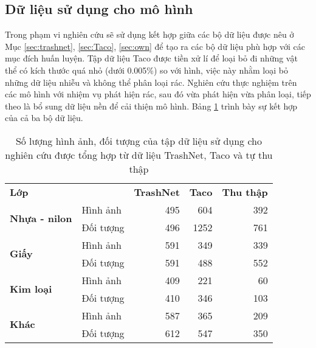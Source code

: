 \documentclass[../the.tex]{subfiles}
\begin{document}
\subsection{Dữ liệu sử dụng cho mô hình}
{\fontsize{13}{12} \selectfont

	Trong phạm vi nghiên cứu sẽ sử dụng kết hợp giữa các bộ dữ liệu được nêu ở Mục \ref{sec:trashnet}, \ref{sec:Taco}, \ref{sec:own} để tạo ra các bộ dữ liệu phù hợp với các mục đích huấn luyện.
	Tập dữ liệu Taco được tiền xử lí để loại bỏ đi những vật thể có kích thước quá nhỏ (dưới 0.005\%) so với hình, việc này nhằm loại bỏ những dữ liệu nhiễu và không thể phân loại rác.
	Nghiên cứu thực nghiệm trên các mô hình với nhiệm vụ phát hiện rác, sau đó vừa phát hiện vừa phân loại, tiếp theo là bổ sung dữ liệu nền để cải thiện mô hình.
	Bảng \ref{tab:datasetmain} trình bày sự kết hợp của cả ba bộ dữ liệu.

}

\begin{table}[!ht]
	\centering
	\caption{Số lượng hình ảnh, đối tượng của tập dữ liệu sử dụng cho nghiên cứu được tổng hợp từ dữ liệu TrashNet, Taco và tự thu thập}
	\begin{tabular}{|l|l|r|r|r|}
		\cline{1-5}
		\textbf{Lớp}                           &            &\textbf{TrashNet} & \textbf{Taco} & \textbf{Thu thập} \\ \cline{1-5}
		\multirow{2}{*}{\textbf{Nhựa - nilon}} & Hình ảnh   & 495               & 604           & 392               \\ \cline{2-5}
		                                       & Đối tượng  & 496               & 1252          & 761               \\ \cline{1-5}
		\multirow{2}{*}{\textbf{Giấy}}         & Hình ảnh   & 591               & 349           & 339               \\ \cline{2-5}
		                                       & Đối tượng  & 591               & 488           & 552               \\ \cline{1-5}
		\multirow{2}{*}{\textbf{Kim loại}}     & Hình ảnh   & 409               & 221           & 60                \\ \cline{2-5}
		                                       & Đối tượng  & 410               & 346           & 103               \\ \cline{1-5}
		\multirow{2}{*}{\textbf{Khác}}     & Hình   ảnh & 587               & 365           & 209               \\ \cline{2-5}
		                                       & Đối tượng  & 612               & 547           & 350               \\ \cline{1-5}
	\end{tabular}
	\label{tab:datasetmain}
\end{table}
\end{document}

